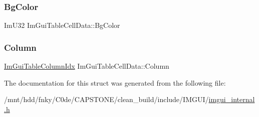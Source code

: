 \subsubsection{\texorpdfstring{Bg\+Color}{BgColor}}
{\footnotesize\ttfamily Im\+U32 Im\+Gui\+Table\+Cell\+Data\+::\+Bg\+Color}

\mbox{\label{structImGuiTableCellData_af7a86d9930e122fcd98c28f076fc68cc}} 
\subsubsection{\texorpdfstring{Column}{Column}}
{\footnotesize\ttfamily \hyperlink{imgui__internal_8h_abe1882c8292cd23a77a54eda2407f147}{Im\+Gui\+Table\+Column\+Idx} Im\+Gui\+Table\+Cell\+Data\+::\+Column}



The documentation for this struct was generated from the following file\+:\begin{DoxyCompactItemize}
\item 
/mnt/hdd/fnky/\+C0de/\+C\+A\+P\+S\+T\+O\+N\+E/clean\+\_\+build/include/\+I\+M\+G\+U\+I/\hyperlink{imgui__internal_8h}{imgui\+\_\+internal.\+h}\end{DoxyCompactItemize}
